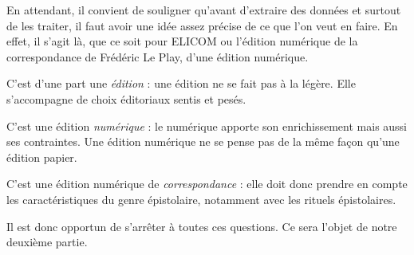 En attendant, il convient de souligner qu'avant d'extraire des données et surtout de les traiter, il faut avoir une idée assez précise de ce que l'on veut en faire. 
En effet, il s'agit là, que ce soit pour ELICOM ou l'édition numérique de la correspondance de Frédéric Le Play, d'une édition numérique.

C'est d'une part une \emph{édition} : une édition ne se fait pas à la légère. Elle s'accompagne de choix éditoriaux sentis et pesés.

C'est une édition \emph{numérique} : le numérique apporte son enrichissement mais aussi ses contraintes. Une édition numérique ne se pense pas de la même façon qu'une édition papier. 

C'est une édition numérique de \emph{correspondance} : elle doit donc prendre en compte les caractéristiques du genre épistolaire, notamment avec les rituels épistolaires.

Il est donc opportun de s'arrêter à toutes ces questions. Ce sera l'objet de notre deuxième partie.
